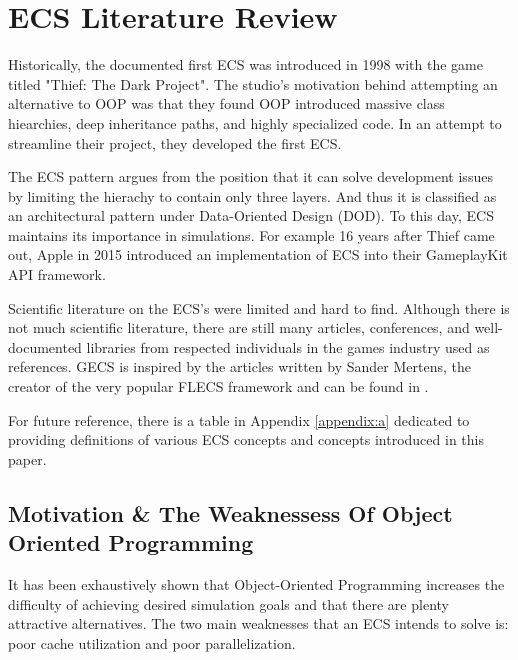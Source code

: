 \section{ECS Literature Review}
\label{chap:1}

Historically, the documented first ECS was introduced in 1998 with the game titled "Thief: The Dark Project".\cite{RomeoPHD} The studio's motivation behind attempting an alternative to OOP was that they found OOP introduced massive class hiearchies, deep inheritance paths, and highly specialized code. In an attempt to streamline their project, they developed the first ECS.\cite{Haerkoenen2019}

The ECS pattern argues from the position that it can solve development issues by limiting the hierachy to contain only three layers. And thus it is classified as an architectural pattern under Data-Oriented Design (DOD).\cite{RomeoPHD} To this day, ECS maintains its importance in simulations. For example 16 years after Thief came out, Apple in 2015 introduced an implementation of ECS into their GameplayKit API framework. \cite{AppleECS}

Scientific literature on the ECS's were limited and hard to find. Although there is not much scientific literature, there are still many articles, conferences, and well-documented libraries from respected individuals in the games industry used as references. GECS is inspired by the articles written by Sander Mertens, the creator of the very popular FLECS framework and can be found in \cite{SanderMertensECS}. 

For future reference, there is a table in Appendix \ref{appendix:a} dedicated to providing definitions of various ECS concepts and concepts introduced in this paper.

\subsection{Motivation \& The Weaknessess Of Object Oriented Programming}

It has been exhaustively shown that Object-Oriented Programming increases the difficulty of achieving desired simulation goals and that there are plenty attractive alternatives. The two main weaknesses that an ECS intends to solve is: poor cache utilization and poor parallelization.\cite{RomeoPHD}

